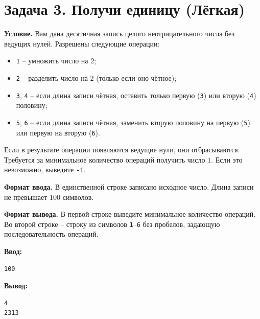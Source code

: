 \section*{Задача 3. Получи единицу (Лёгкая)}
\textbf{Условие.} Вам дана десятичная запись целого неотрицательного числа без ведущих нулей. Разрешены следующие операции:
\begin{itemize}
    \item \texttt{1} -- умножить число на $2$;
    \item \texttt{2} -- разделить число на $2$ (только если оно чётное);
    \item \texttt{3}, \texttt{4} -- если длина записи чётная, оставить только первую (\texttt{3}) или вторую (\texttt{4}) половину;
    \item \texttt{5}, \texttt{6} -- если длина записи чётная, заменить вторую половину на первую (\texttt{5}) или первую на вторую (\texttt{6}).
\end{itemize}
Если в результате операции появляются ведущие нули, они отбрасываются. Требуется за минимальное количество операций получить число $1$. Если это невозможно, выведите \texttt{-1}.

\textbf{Формат ввода.} В единственной строке записано исходное число. Длина записи не превышает $100$ символов.

\textbf{Формат вывода.} В первой строке выведите минимальное количество операций. Во второй строке -- строку из символов \texttt{1}--\texttt{6} без пробелов, задающую последовательность операций.

\begin{examplebox}
  \begin{minipage}[t]{0.48\linewidth}
    \textbf{Ввод:}\\
    \begin{verbatim}
100
    \end{verbatim}
  \end{minipage}%
  \hfill%
  \begin{minipage}[t]{0.48\linewidth}
    \textbf{Вывод:}\\
    \begin{verbatim}
4
2313
    \end{verbatim}
  \end{minipage}
\end{examplebox}